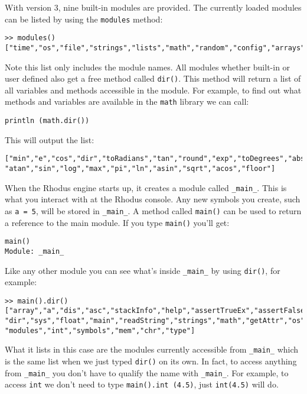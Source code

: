 With version 3, nine built-in modules are provided. The currently loaded modules can be listed by using the {\tt modules{}} method:

\begin{lstlisting}
>> modules()
["time","os","file","strings","lists","math","random","config","arrays"]
\end{lstlisting}

Note this list only includes the module names. All modules whether built-in or user defined also get a free method called {\tt dir()}. This method will return a list of all variables and methods accessible in the module. For example, to find out what methods and variables are available in the {\tt math} library we can call:

\begin{lstlisting}
println (math.dir())
\end{lstlisting}

This will output the list:

\begin{lstlisting}
["min","e","cos","dir","toRadians","tan","round","exp","toDegrees","abs","ceil",
"atan","sin","log","max","pi","ln","asin","sqrt","acos","floor"]
\end{lstlisting}

When the Rhodus engine starts up, it creates a module called {\tt _main_}. This is what you interact with at the Rhodus console. Any new symbols you create, such as {\tt a = 5}, will be stored in {\tt _main_}.  A method called {\tt main()} can be used to return a reference to the main module. If you type {\tt main()} you'll get:

\begin{lstlisting}
main()
Module: _main_
\end{lstlisting}

Like any other module you can see what's inside {\tt _main_} by using {\tt dir()}, for example:

\begin{lstlisting}
>> main().dir()
["array","a","dis","asc","stackInfo","help","assertTrueEx","assertFalseEx","lists",
"dir","sys","float","main","readString","strings","math","getAttr","os","readNumber",
"modules","int","symbols","mem","chr","type"]
\end{lstlisting}

What it lists in this case are the modules currently accessible from {\tt _main_} which is the same list when we just typed {\tt dir()} on its own. In fact, to access anything from {\tt _main_} you don't have to qualify the name with {\tt _main_}. For example, to access {\tt int} we don't need to type {\tt main().int (4.5)}, just {\tt int(4.5)} will do.

